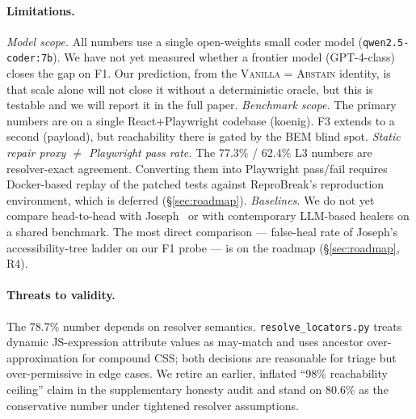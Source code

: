 \paragraph{Limitations.}
\textit{Model scope.} All numbers use a single open-weights small coder model (\texttt{qwen2.5-coder:7b}). We have not yet measured whether a frontier model (GPT-4-class) closes the gap on F1. Our prediction, from the \textsc{Vanilla = Abstain} identity, is that scale alone will not close it without a deterministic oracle, but this is testable and we will report it in the full paper.
\textit{Benchmark scope.} The primary numbers are on a single React+Playwright codebase (koenig). F3 extends to a second (payload), but reachability there is gated by the BEM blind spot.
\textit{Static repair proxy $\ne$ Playwright pass rate.} The 77.3\% / 62.4\% L3 numbers are resolver-exact agreement. Converting them into Playwright pass/fail requires Docker-based replay of the patched tests against ReproBreak's reproduction environment, which is deferred (\S\ref{sec:roadmap}).
\textit{Baselines.} We do not yet compare head-to-head with Joseph~\cite{joseph2026zerocost} or with contemporary LLM-based healers on a shared benchmark. The most direct comparison --- false-heal rate of Joseph's accessibility-tree ladder on our F1 probe --- is on the roadmap (\S\ref{sec:roadmap}, R4).

\paragraph{Threats to validity.}
The 78.7\% number depends on resolver semantics. \texttt{resolve\_locators.py} treats dynamic JS-expression attribute values as may-match and uses ancestor over-approximation for compound CSS; both decisions are reasonable for triage but over-permissive in edge cases. We retire an earlier, inflated ``98\% reachability ceiling'' claim in the supplementary honesty audit and stand on 80.6\% as the conservative number under tightened resolver assumptions.
